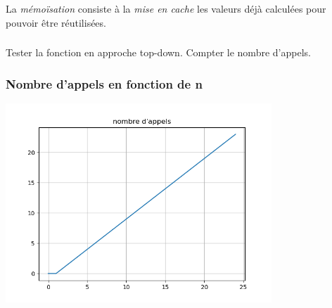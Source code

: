 \documentclass[svgnames,11pt]{beamer}
\begin{document}
\begin{frame}
    \frametitle{}

    \begin{aretenir}[]
        La \emph{mémoïsation} consiste à la \emph{mise en cache} les valeurs déjà calculées pour pouvoir être réutilisées.
    \end{aretenir}

\end{frame}

\begin{frame}
    \frametitle{}

    \begin{activite}
        Tester la fonction en approche top-down. Compter le nombre d'appels.
    \end{activite}

\end{frame}
\begin{frame}
    \frametitle{Nombre d'appels en fonction de n}

    \begin{center}
        \centering
        \includegraphics[width=10cm]{ressources/nb-appels-dyn.png}
        \label{IMG}
    \end{center}

\end{frame}
\end{document}
